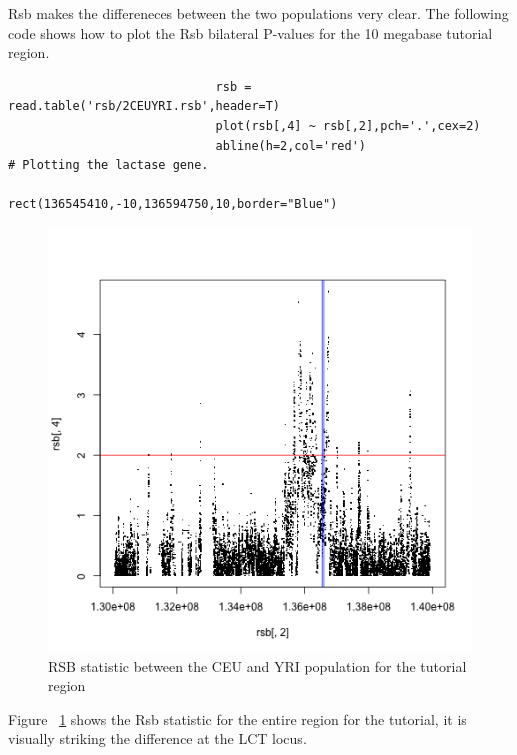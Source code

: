 \documentclass[a4paper,10pt]{article}
\begin{document}
                             Rsb makes the differeneces between the two populations very clear. The following code shows how to plot the Rsb bilateral P-values for the 10 megabase tutorial region.

                             \begin{verbatim}
                             rsb = read.table('rsb/2CEUYRI.rsb',header=T)
                             plot(rsb[,4] ~ rsb[,2],pch='.',cex=2)
                             abline(h=2,col='red')
# Plotting the lactase gene.
                             rect(136545410,-10,136594750,10,border="Blue")
                             \end{verbatim}

                             \begin{figure}
                             \centering
                             \includegraphics{pictures/RSBCEUYRI.png}
                             \caption{RSB statistic between the CEU and YRI population for the tutorial region} 
                             \label{fig:rsb}
                             \end{figure}
                             Figure ~\ref{fig:rsb} shows the Rsb statistic for the entire region for the tutorial, it is visually striking the difference at the LCT locus.

                             \pagebreak
\end{document}
